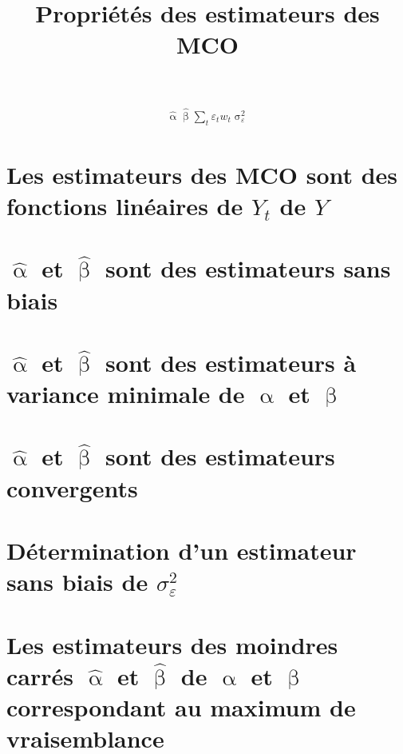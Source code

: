 \documentclass{article}
\title{Propriétés des estimateurs des MCO}
\begin{document}
\newcommand{\halpha}{\hat{\upalpha}}
\newcommand{\hbeta}{\hat{\upbeta}}
\newcommand{\sumt}{\sum_t}
\newcommand{\epsilont}{\varepsilon_t}
\newcommand{\wt}{w_t}
\newcommand{\sig}{\upsigma_\varepsilon^2}
\newcommand{\xt}{x_t}
\n

\begin{align*}
\halpha
\hbeta
\sumt
\epsilont
\wt
\sig
\end{align*}


\maketitle
\tableofcontents
\newpage

\section{Les estimateurs des MCO sont des fonctions linéaires de \(Y_t\) de \(Y\)}

\section{\(\halpha\) et \(\hbeta\) sont des estimateurs sans biais}

\section{\(\halpha\) et \(\hbeta\) sont des estimateurs à variance minimale de \(\upalpha\) et \(\upbeta\)}

\section{\(\halpha\) et \(\hbeta\) sont des estimateurs convergents}

\section{Détermination d'un estimateur sans biais de \(\sigma_\varepsilon^2\)}

\section{Les estimateurs des moindres carrés \(\halpha\) et \(\hbeta\) de \(\upalpha\) et \(\upbeta\) correspondant au maximum de vraisemblance}
\end{document}
